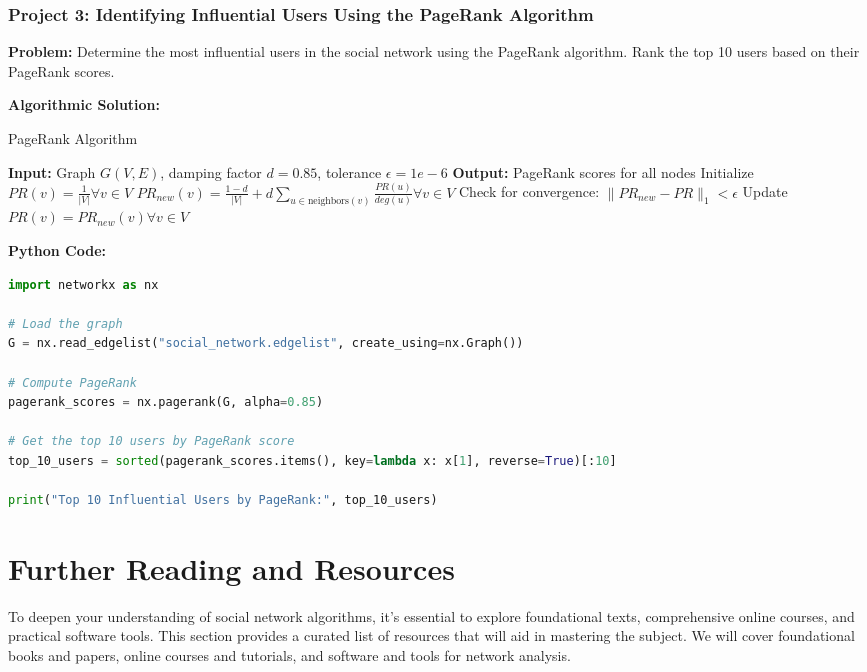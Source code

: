\documentclass[12pt]{book} %
\begin{document}
\subsubsection*{Project 3: Identifying Influential Users Using the PageRank Algorithm}
\textbf{Problem:} Determine the most influential users in the social network using the PageRank algorithm. Rank the top 10 users based on their PageRank scores.

\textbf{Algorithmic Solution:}
\begin{algorithm}
\caption{PageRank Algorithm}
\begin{algorithmic}
\State \textbf{Input:} Graph $G(V, E)$, damping factor $d = 0.85$, tolerance $\epsilon = 1e-6$
\State \textbf{Output:} PageRank scores for all nodes
\State Initialize $PR(v) = \frac{1}{|V|} \forall v \in V$
\Repeat
    \State $PR_{new}(v) = \frac{1-d}{|V|} + d \sum_{u \in \text{neighbors}(v)} \frac{PR(u)}{deg(u)} \forall v \in V$
    \State Check for convergence: $\|PR_{new} - PR\|_1 < \epsilon$
    \State Update $PR(v) = PR_{new}(v) \forall v \in V$
\end{algorithmic}
\end{algorithm}

\FloatBarrier
\textbf{Python Code:}
\begin{lstlisting}[language=Python]
import networkx as nx

# Load the graph
G = nx.read_edgelist("social_network.edgelist", create_using=nx.Graph())

# Compute PageRank
pagerank_scores = nx.pagerank(G, alpha=0.85)

# Get the top 10 users by PageRank score
top_10_users = sorted(pagerank_scores.items(), key=lambda x: x[1], reverse=True)[:10]

print("Top 10 Influential Users by PageRank:", top_10_users)
\end{lstlisting}
\FloatBarrier


\section{Further Reading and Resources}
To deepen your understanding of social network algorithms, it's essential to explore foundational texts, comprehensive online courses, and practical software tools. This section provides a curated list of resources that will aid in mastering the subject. We will cover foundational books and papers, online courses and tutorials, and software and tools for network analysis.
\end{document}
